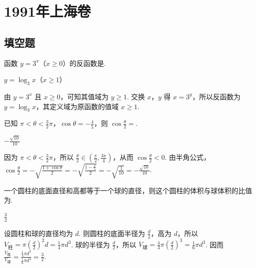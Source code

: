 \chapter{1991年上海卷}
\section{填空题}

\begin{problem}
函数 \(y = 3^x\)（\(x \geqslant 0\)）的反函数是\fillinblank{}.
\end{problem}

\begin{answer}
\(y = \log_3 x\)（\(x \geqslant 1\)）
\end{answer}

\begin{solution}
由 \(y=3^x\) 且 \(x\geqslant0\)，可知其值域为 \(y\geqslant1\). 交换 \(x\)，\(y\) 得 \(x=3^y\)，所以反函数为 \(y=\log_3x\)，其定义域为原函数的值域 \(x\geqslant1\).
\end{solution}

\begin{problem}
已知 \(\pi < \theta < \frac{3}{2}\pi\)，\(\cos \theta = -\frac{4}{5}\)，则 \(\cos \frac{\theta}{2} =\)\fillinblank{}.
\end{problem}

\begin{answer}
\(-\frac{\sqrt{10}}{10}\)
\end{answer}

\begin{solution}
因为 \(\pi<\theta<\frac{3}{2}\pi\)，所以 \(\frac{\theta}{2}\in\left(\frac{\pi}{2},\frac{3\pi}{4}\right)\)，从而 \(\cos\frac{\theta}{2}<0\). 由半角公式，
\(\cos\frac{\theta}{2}=-\sqrt{\frac{1+\cos\theta}{2}}=-\sqrt{\frac{1-\frac45}{2}}=-\sqrt{\frac1{10}}=-\frac{\sqrt{10}}{10}\).
\end{solution}

\begin{problem}
一个圆柱的底面直径和高都等于一个球的直径，则这个圆柱的体积与球体积的比值为\fillinblank{}.
\end{problem}

\begin{answer}
\(\frac{3}{2}\)
\end{answer}

\begin{solution}
设圆柱和球的直径均为 \(d\). 则圆柱的底面半径为 \(\frac d2\)，高为 \(d\)，所以 \(V_{\text{柱}}=\pi\left(\frac d2\right)^2d=\frac14\pi d^3\). 球的半径为 \(\frac d2\)，所以 \(V_{\text{球}}=\frac43\pi\left(\frac d2\right)^3=\frac16\pi d^3\). 因而
\(\frac{V_{\text{柱}}}{V_{\text{球}}}=\frac{\frac14\pi d^3}{\frac16\pi d^3}=\frac32\).
\end{solution}

